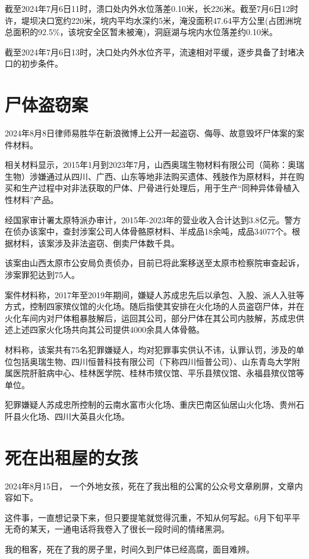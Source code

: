 截至2024年7月6日11时，溃口处内外水位落差0.10米，长226米。截至7月6日12时许，堤坝决口宽约220米，垸内平均水深约5米，淹没面积47.64平方公里(占团洲垸总面积的92.5\%，该垸安全区暂未被淹)，洞庭湖与垸内水位落差约0.10米。

截至2024年7月6日13时，决口处内外水位齐平，流速相对平缓，逐步具备了封堵决口的初步条件。

\section{尸体盗窃案}

2024年8月8日律师易胜华在新浪微博上公开一起盗窃、侮辱、故意毁坏尸体案的案件材料。

相关材料显示，2015年1月到2023年7月，山西奥瑞生物材料有限公司（简称：奥瑞生物）涉嫌通过从四川、广西、山东等地非法购买遗体、残肢作为原材料，并在购买和生产过程中对非法获取的尸体、尸骨进行处理后，用于生产“同种异体骨植入性材料”产品。

经国家审计署太原特派办审计，2015年-2023年的营业收入合计达到3.8亿元。警方在侦办该案中，查封涉案公司人体骨骼原材料、半成品18余吨，成品34077个。根据材料，该案涉及非法盗窃、倒卖尸体数千具。

该案由山西太原市公安局负责侦办，目前已将此案移送至太原市检察院审查起诉，涉案罪犯达到75人。

案件材料称，2017年至2019年期间，嫌疑人苏成忠先后以承包、入股、派人入驻等方式，控制四家殡仪馆的火化场。随后指使其安排在火化场的人员盗窃尸体，并在火化车间内对尸体粗暴肢解后，运回其公司，部分尸体在其公司内肢解，苏成忠供述上述四家火化场共向其公司提供4000余具人体骨骼。

材料称，该案共有75名犯罪嫌疑人，均对犯罪事实供认不讳，认罪认罚，涉及的单位包括奥瑞生物、四川恒普科技有限公司（下称四川恒普公司）、山东青岛大学附属医院肝脏病中心、桂林医学院、桂林市殡仪馆、平乐县殡仪馆、永福县殡仪馆等单位。

犯罪嫌疑人苏成忠所控制的云南水富市火化场、重庆巴南区仙居山火化场、贵州石阡县火化场、四川大英县火化场。

\section{死在出租屋的女孩}

2024年8月15日， 一个外地女孩，死在了我出租的公寓的公众号文章刷屏，文章内容如下。

这件事，一直想记录下来，但只要提笔就觉得沉重，不知从何写起。6月下旬平平无奇的某天，一通电话将我卷入了很长一段时间的情绪黑洞。

我的租客，死在了我的房子里，时间久到尸体已经高腐，面目难辨。

